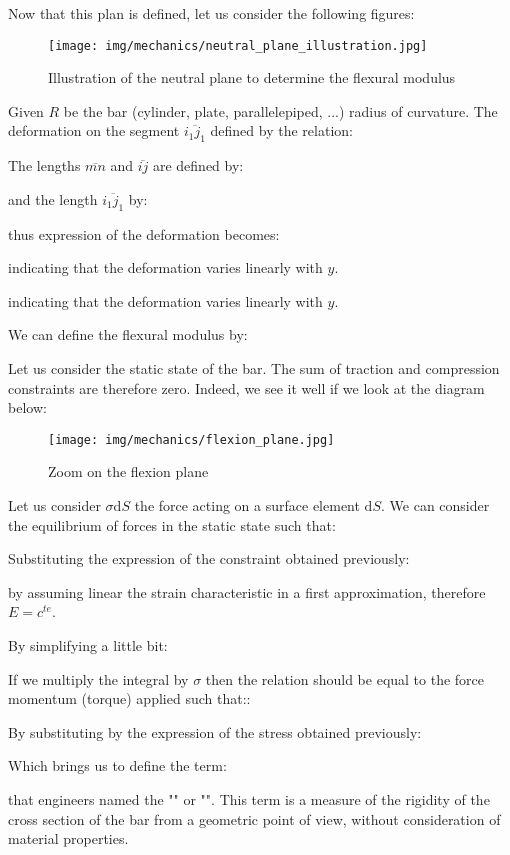 	Now that this plan is defined, let us consider the following figures:
	\begin{figure}[H]
		\centering
		\texttt{[image: img/mechanics/neutral\_plane\_illustration.jpg]}
		\caption[]{Illustration of the neutral plane to determine the flexural modulus}
	\end{figure}
	Given $R$ be the bar (cylinder, plate, parallelepiped, ...) radius of curvature. The deformation on the segment $\overline{i_1j_1}$ defined by the relation:
	
	The lengths $\overline{mn}$ and $\overline{ij}$ are defined by:
	
	and the length $\overline{i_1j_1}$ by:
	
	thus expression of the deformation becomes:
	
	indicating that the deformation varies linearly with $y$.
	
	indicating that the deformation varies linearly with $y$.

	We can define the flexural modulus by:
	
	Let us consider the static state of the bar. The sum of traction and compression constraints are therefore zero. Indeed, we see it well if we look at the diagram below:
	\begin{figure}[H]
		\centering
		\texttt{[image: img/mechanics/flexion\_plane.jpg]}
		\caption[]{Zoom on the flexion plane}
	\end{figure}
	Let us consider $\sigma\mathrm{d}S$ the force acting on a surface element $\mathrm{d}S$. We can consider the equilibrium of forces in the static state such that:
	
	Substituting the expression of the constraint obtained previously:
	
	by assuming linear the strain characteristic in a first approximation, therefore $E=c^{te}$.

	By simplifying a little bit:
	
	If we multiply the integral by $\sigma$ then the relation should be equal to the force momentum (torque) applied such that::
	
	By substituting by the expression of the stress obtained previously:
	
	Which brings us to define the term:
	
	that engineers named the "" or "". This term is a measure of the rigidity of the cross section of the bar from a geometric point of view, without consideration of material properties.

